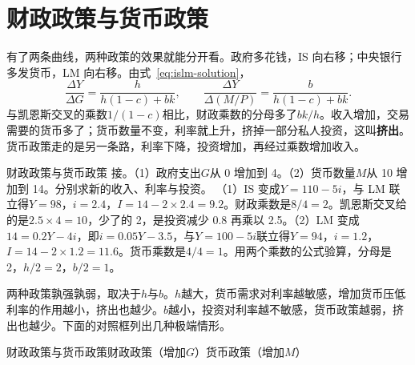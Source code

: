 
\section{财政政策与货币政策}\label{sec:islm-policy}

有了两条曲线，两种政策的效果就能分开看。政府多花钱，IS 向右移；中央银行多发货币，LM 向右移。由式~\eqref{eq:islm-solution}，
\[
\frac{\Delta Y}{\Delta G}=\frac{h}{h(1-c)+bk},\qquad \frac{\Delta Y}{\Delta (M/P)}=\frac{b}{h(1-c)+bk}.
\]
与凯恩斯交叉的乘数$1/(1-c)$相比，财政乘数的分母多了$bk/h$。收入增加，交易需要的货币多了；货币数量不变，利率就上升，挤掉一部分私人投资，这叫\textbf{挤出}。货币政策走的是另一条路，利率下降，投资增加，再经过乘数增加收入。

\begin{example}{财政政策与货币政策}\label{ex:islm-policy}
接。（1）政府支出$G$从 0 增加到 4。（2）货币数量$M$从 10 增加到 14。分别求新的收入、利率与投资。
\solution
（1）IS 变成$Y=110-5i$，与 LM 联立得$Y=98$，$i=2.4$，$I=14-2\times2.4=9.2$。财政乘数是$8/4=2$。凯恩斯交叉给的是$2.5\times4=10$，少了的 2，是投资减少 0.8 再乘以 2.5。（2）LM 变成$14=0.2Y-4i$，即$i=0.05Y-3.5$，与$Y=100-5i$联立得$Y=94$，$i=1.2$，$I=14-2\times1.2=11.6$。货币乘数是$4/4=1$。用两个乘数的公式验算，分母是 2，$h/2=2$，$b/2=1$。
\end{example}

两种政策孰强孰弱，取决于$h$与$b$。$h$越大，货币需求对利率越敏感，增加货币压低利率的作用越小，挤出也越少。$b$越小，投资对利率越不敏感，货币政策越弱，挤出也越少。下面的对照框列出几种极端情形。

\begin{compare}{财政政策与货币政策}{财政政策（增加$G$）}{货币政策（增加$M$）}
\end{compare}

